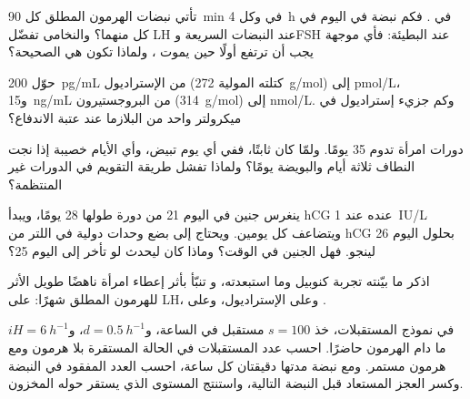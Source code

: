 \begin{exercise}[$\star\star$]\label{exo:b2:reproductive-hormones:5}
تأتي نبضات الهرمون المطلق كل \qty{90}{min} في 
وكل \qty{4}{h} في . فكم نبضة في اليوم في كل منهما؟
والنخامى تفضّل LH عند النبضات السريعة وFSH عند البطيئة: فأي
موجهة يجب أن ترتفع أولًا حين يموت ، ولماذا
تكون هي الصحيحة؟
\end{exercise}

\begin{exercise}[$\star\star$]\label{exo:b2:reproductive-hormones:6}
حوّل \qty{200}{pg/mL} من الإستراديول (كتلته المولية
\qty{272}{g/mol}) إلى \unit{pmol/L}، و\qty{15}{ng/mL} من
البروجستيرون (\qty{314}{g/mol}) إلى \unit{nmol/L}. وكم
جزيء إستراديول في ميكرولتر واحد من البلازما عند
عتبة الاندفاع؟
\end{exercise}

\begin{exercise}[$\star\star$]\label{exo:b2:reproductive-hormones:7}
دورات امرأة تدوم 35 يومًا. ولمّا كان 
ثابتًا، ففي أي يوم تبيض، وأي الأيام خصيبة إذا
نجت النطاف ثلاثة أيام والبويضة يومًا؟ ولماذا تفشل طريقة
التقويم في الدورات غير المنتظمة؟
\end{exercise}

\begin{exercise}[$\star\star$]\label{exo:b2:reproductive-hormones:8}
ينغرس جنين في اليوم 21 من دورة طولها 28 يومًا، ويبدأ hCG عنده
عند \qty{1}{IU/L} ويتضاعف كل يومين. ويحتاج  إلى
بضع وحدات دولية في اللتر من hCG بحلول اليوم 26 لينجو. فهل الجنين في الوقت؟ وماذا
كان ليحدث لو تأخر  إلى اليوم 25؟
\end{exercise}

\begin{exercise}[$\star\star$]\label{exo:b2:reproductive-hormones:9}
اذكر ما بيّنته تجربة كنوبيل وما استبعدته، و
تنبّأ بأثر إعطاء امرأة ناهضًا طويل الأثر للهرمون المطلق
شهرًا: على LH، وعلى الإستراديول، وعلى .
\end{exercise}

\begin{exercise}[$\star\star\star$]\label{exo:b2:reproductive-hormones:10}
في نموذج المستقبلات، خذ $s = 100$ مستقبل في الساعة، و$d =
\qty{0.5}{h^{-1}}$، و$iH = \qty{6}{h^{-1}}$ ما دام الهرمون
حاضرًا. احسب عدد المستقبلات في الحالة المستقرة بلا هرمون
ومع هرمون مستمر. ومع نبضة مدتها دقيقتان كل ساعة،
احسب العدد المفقود في النبضة وكسر العجز
المستعاد قبل النبضة التالية، واستنتج المستوى الذي
يستقر حوله المخزون.
\end{exercise}

